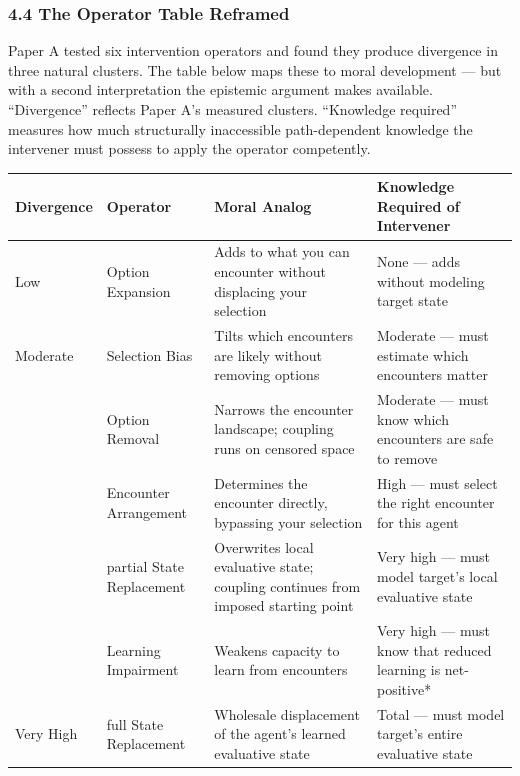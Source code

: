 \documentclass[
]{article}
\newcounter{none} %
\begin{document}
\subsubsection{4.4 The Operator Table
Reframed}\label{the-operator-table-reframed}

Paper A tested six intervention operators and found they produce
divergence in three natural clusters. The table below maps these to
moral development --- but with a second interpretation the epistemic
argument makes available. ``Divergence'' reflects Paper A's measured
clusters. ``Knowledge required'' measures how much structurally
inaccessible path-dependent knowledge the intervener must possess to
apply the operator competently.

{\def\LTcaptype{none} %
\begin{longtable}[]{@{}
  >{\raggedright\arraybackslash}p{}
  >{\raggedright\arraybackslash}p{}
  >{\raggedright\arraybackslash}p{}
  >{\raggedright\arraybackslash}p{}@{}}
\toprule\noalign{}
\begin{minipage}[b]{\linewidth}\raggedright
Divergence
\end{minipage} & \begin{minipage}[b]{\linewidth}\raggedright
Operator
\end{minipage} & \begin{minipage}[b]{\linewidth}\raggedright
Moral Analog
\end{minipage} & \begin{minipage}[b]{\linewidth}\raggedright
Knowledge Required of Intervener
\end{minipage} \\
\midrule\noalign{}
\endhead
\bottomrule\noalign{}
\endlastfoot
Low & Option Expansion & Adds to what you can encounter without
displacing your selection & None --- adds without modeling target
state \\
Moderate & Selection Bias & Tilts which encounters are likely without
removing options & Moderate --- must estimate which encounters matter \\
& Option Removal & Narrows the encounter landscape; coupling runs on
censored space & Moderate --- must know which encounters are safe to
remove \\
& Encounter Arrangement & Determines the encounter directly, bypassing
your selection & High --- must select the right encounter for this
agent \\
& partial State Replacement & Overwrites local evaluative state;
coupling continues from imposed starting point & Very high --- must
model target's local evaluative state \\
& Learning Impairment & Weakens capacity to learn from encounters & Very
high --- must know that reduced learning is net-positive* \\
Very High & full State Replacement & Wholesale displacement of the
agent's learned evaluative state & Total --- must model target's entire
evaluative state \\
\end{longtable}
}
\end{document}
